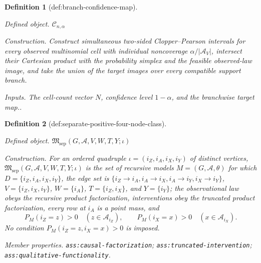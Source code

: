 \documentclass{article}
\newtheorem{definition}{Definition}
\begin{document}
\begin{definition}[def:branch-confidence-map]\label{def:branch-confidence-map}
\par\smallskip\noindent\emph{Defined object.} \(\mathcal C_{n,\alpha}\)
\par\smallskip\noindent\emph{Construction.} Construct simultaneous two-sided Clopper--Pearson intervals for every observed multinomial cell with individual noncoverage \(\alpha/|\mathcal A_V|\), intersect their Cartesian product with the probability simplex and the feasible observed-law image, and take the union of the target images over every compatible support branch.
\par\smallskip\noindent\emph{Inputs.} The cell-count vector \(N\), confidence level \(1-\alpha\), and the branchwise target map..
\end{definition}

\begin{definition}[def:separate-positive-four-node-class]\label{def:separate-positive-four-node-class}
\par\smallskip\noindent\emph{Defined object.} \(\mathfrak M_{\mathrm{sep}}(G,\mathcal A,V,W,T,Y;\iota)\)
\par\smallskip\noindent\emph{Construction.} For an ordered quadruple \(\iota=(i_Z,i_A,i_X,i_Y)\) of distinct
vertices, \(\mathfrak M_{\mathrm{sep}}(G,\mathcal A,V,W,T,Y;\iota)\) is
the set of recursive models \(M=(G,\mathcal A,\theta)\) for which
\(D=\{i_Z,i_A,i_X,i_Y\}\), the edge set is
\(\{i_Z\to i_A,i_A\to i_X,i_A\to i_Y,i_X\to i_Y\}\),
\(V=\{i_Z,i_X,i_Y\}\), \(W=\{i_A\}\),
\(T=\{i_Z,i_X\}\), and \(Y=\{i_Y\}\); the observational law obeys the
recursive product factorization, interventions obey the truncated product
factorization, every row at \(i_A\) is a point mass, and
\[
 P_M(i_Z=z)>0\quad(z\in\mathcal A_{i_Z}),
 \qquad
 P_M(i_X=x)>0\quad(x\in\mathcal A_{i_X}).
\]
No condition \(P_M(i_Z=z,i_X=x)>0\) is imposed.
\par\smallskip\noindent\emph{Member properties.} \texttt{ass:\allowbreak{}causal-\allowbreak{}factorization}; \texttt{ass:\allowbreak{}truncated-\allowbreak{}intervention}; \texttt{ass:\allowbreak{}qualitative-\allowbreak{}functionality}.
\end{definition}
\end{document}
